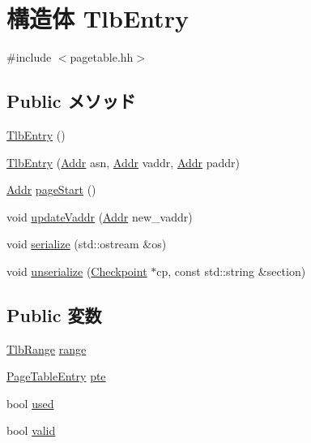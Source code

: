 \hypertarget{structSparcISA_1_1TlbEntry}{
\section{構造体 TlbEntry}
\label{structSparcISA_1_1TlbEntry}
}


{\ttfamily \#include $<$pagetable.hh$>$}\subsection*{Public メソッド}
\begin{DoxyCompactItemize}
\item 
\hyperlink{structSparcISA_1_1TlbEntry_ad069716fb78ffaa2d9bfba679a8eac9a}{TlbEntry} ()
\item 
\hyperlink{structSparcISA_1_1TlbEntry_a69a4824fbe38adbd1517dda05272617d}{TlbEntry} (\hyperlink{base_2types_8hh_af1bb03d6a4ee096394a6749f0a169232}{Addr} asn, \hyperlink{base_2types_8hh_af1bb03d6a4ee096394a6749f0a169232}{Addr} vaddr, \hyperlink{base_2types_8hh_af1bb03d6a4ee096394a6749f0a169232}{Addr} paddr)
\item 
\hyperlink{base_2types_8hh_af1bb03d6a4ee096394a6749f0a169232}{Addr} \hyperlink{structSparcISA_1_1TlbEntry_a4f87fae41ff4bd27577a41dba3cf2b90}{pageStart} ()
\item 
void \hyperlink{structSparcISA_1_1TlbEntry_a5b72666b92ee0adbe9a7d218a0343754}{updateVaddr} (\hyperlink{base_2types_8hh_af1bb03d6a4ee096394a6749f0a169232}{Addr} new\_\-vaddr)
\item 
void \hyperlink{structSparcISA_1_1TlbEntry_a53e036786d17361be4c7320d39c99b84}{serialize} (std::ostream \&os)
\item 
void \hyperlink{structSparcISA_1_1TlbEntry_af22e5d6d660b97db37003ac61ac4ee49}{unserialize} (\hyperlink{classCheckpoint}{Checkpoint} $\ast$cp, const std::string \&section)
\end{DoxyCompactItemize}
\subsection*{Public 変数}
\begin{DoxyCompactItemize}
\item 
\hyperlink{structSparcISA_1_1TlbRange}{TlbRange} \hyperlink{structSparcISA_1_1TlbEntry_a11b43184b3c2df2015fefa5beb543d55}{range}
\item 
\hyperlink{classSparcISA_1_1PageTableEntry}{PageTableEntry} \hyperlink{structSparcISA_1_1TlbEntry_a97776a0e0f255c02dcb71ea59ea2c551}{pte}
\item 
bool \hyperlink{structSparcISA_1_1TlbEntry_accd366cbfd7b8a1b904ca4177a894f95}{used}
\item 
bool \hyperlink{structSparcISA_1_1TlbEntry_a28e3c179a86f337095088b3ca02a2b2a}{valid}
\end{DoxyCompactItemize}



